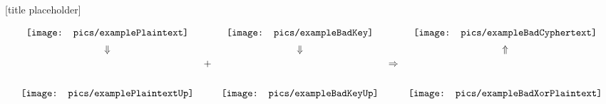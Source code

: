 \documentclass{beamer}
\newcommand{\examplePlaintext}{\mathord{\texttt{[image: pics/examplePlaintext]}}}
\newcommand{\examplePlaintextUp}{\mathord{\texttt{[image: pics/examplePlaintextUp]}}}
\newcommand{\exampleBadCyphertext}{\mathord{\texttt{[image: pics/exampleBadCyphertext]}}}
\newcommand{\exampleBadKey}{\mathord{\texttt{[image: pics/exampleBadKey]}}}
\newcommand{\exampleBadKeyUp}{\mathord{\texttt{[image: pics/exampleBadKeyUp]}}}
\newcommand{\exampleBadXorCyphertext}{\mathord{\texttt{[image: pics/exampleBadXorPlaintext]}}}
\begin{document}
\begin{frame}{[title placeholder]}

\begin{equation*}
\begin{array}{ccccc}
\examplePlaintext &  & \exampleBadKey & & \exampleBadCyphertext \vspace{0.5em}\\
\Downarrow &  & \Downarrow& & \Uparrow \vspace{0.5em}\\
\examplePlaintextUp & \raisebox{7ex}{+} & \exampleBadKeyUp & \raisebox{7ex}{$\Rightarrow$} & \exampleBadXorCyphertext
\end{array}
\end{equation*}

\end{frame}
\end{document}
